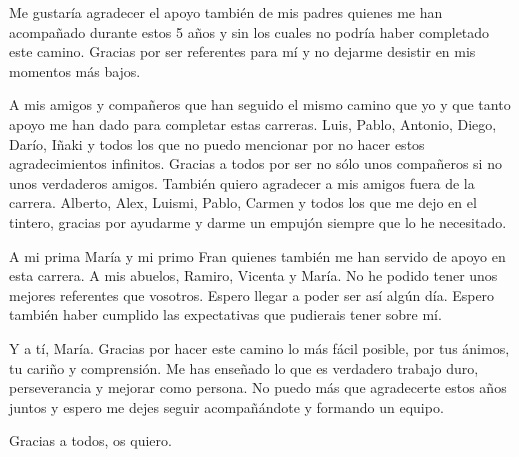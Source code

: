 Me gustaría agradecer el apoyo también de mis padres quienes me han acompañado durante estos 5 años y sin los cuales no podría haber completado este camino. Gracias por ser referentes para mí y no dejarme desistir en mis momentos más bajos.

A mis amigos y compañeros que han seguido el mismo camino que yo y que tanto apoyo me han dado para completar estas carreras. Luis, Pablo, Antonio, Diego, Darío, Iñaki y todos los que no puedo mencionar por no hacer estos agradecimientos infinitos. Gracias a todos por ser no sólo unos compañeros si no unos verdaderos amigos. También quiero agradecer a mis amigos fuera de la carrera. Alberto, Alex, Luismi, Pablo, Carmen y todos los que me dejo en el tintero, gracias por ayudarme y darme un empujón siempre que lo he necesitado.

A mi prima María y mi primo Fran quienes también me han servido de apoyo en esta carrera. A mis abuelos, Ramiro, Vicenta y María. No he podido tener unos mejores referentes que vosotros. Espero llegar a poder ser así algún día. Espero también haber cumplido las expectativas que pudierais tener sobre mí.

Y a tí, María. Gracias por hacer este camino lo más fácil posible, por tus ánimos, tu cariño y comprensión. Me has enseñado lo que es verdadero trabajo duro, perseverancia y mejorar como persona. No puedo más que agradecerte estos años juntos y espero me dejes seguir acompañándote y formando un equipo.

Gracias a todos, os quiero.
